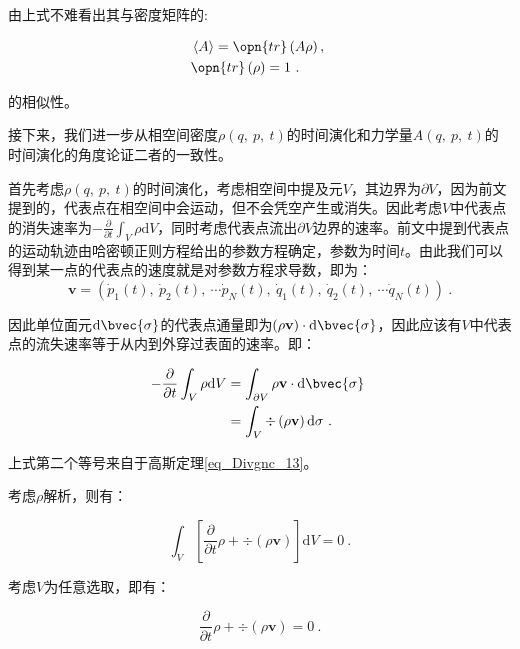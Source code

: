 由上式不难看出其与密度矩阵的:

\begin{equation}
\begin{aligned}
&\left\langle A \right\rangle = \opn{tr}\left(A\rho\right), \\
& \opn{tr}\left(\rho\right)=1~.
\end{aligned}~
\end{equation}

的相似性。

接下来，我们进一步从相空间密度$\rho\left(q,~p,~t\right)$的时间演化和力学量$ A\left(q,~p,~t\right)$的时间演化的角度论证二者的一致性。

首先考虑$\rho\left(q,~p,~t\right)$的时间演化，考虑相空间中提及元$V$，其边界为$\partial V$，因为前文提到的，代表点在相空间中会运动，但不会凭空产生或消失。因此考虑$V$中代表点的消失速率为$-\frac{\partial}{\partial t}\int_V \rho \mathrm{d}V$，同时考虑代表点流出$\partial V$边界的速率。前文中提到代表点的运动轨迹由哈密顿正则方程给出的参数方程确定，参数为时间$t$。由此我们可以得到某一点的代表点的速度就是对参数方程求导数，即为：$$\mathbf{v} = \left(\dot{p}_1(t),~\dot{p}_2(t),~\cdots \dot{p}_N(t),~\dot{q}_1(t),~\dot{q}_2(t),~\cdots \dot{q}_N(t)\right)~.$$

因此单位面元$\mathrm{d}\bvec{\sigma}$的代表点通量即为$\left(\rho\mathbf{v}\right)\cdot \mathrm{d}\bvec{\sigma}$，因此应该有$V$中代表点的流失速率等于从内到外穿过表面的速率。即：

\begin{equation}
\begin{aligned}
-\frac{\partial}{\partial t}\int_V \rho \mathrm{d}V &= \int_{\partial V}\rho\mathbf{v}\cdot \mathrm{d}\bvec{\sigma} \\
&=\int_V\div\left(\rho\mathbf{v}\right)\mathrm{d}\sigma~.
\end{aligned}~
\end{equation}

上式第二个等号来自于高斯定理\autoref{eq_Divgnc_13}。

考虑$\rho$解析，则有：

$$\int_V \left[\frac{\partial}{\partial t}\rho +\div\left(\rho\mathbf{v}\right)\right]\mathrm{d}V  = 0~.$$

考虑$V$为任意选取，即有：

\begin{equation}\label{eq_denMat_8}
\frac{\partial}{\partial t}\rho +\div\left(\rho\mathbf{v}\right)= 0~.
\end{equation}


